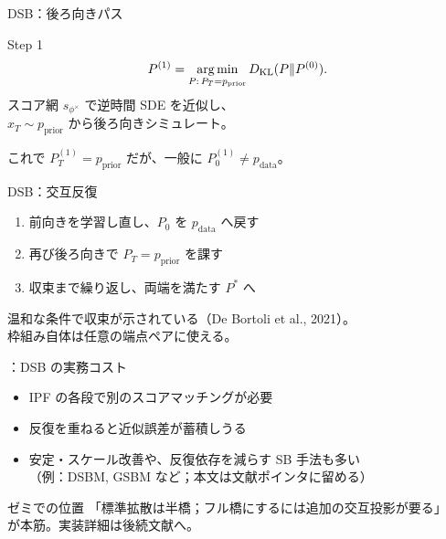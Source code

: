 \asmain
\begin{frame}{DSB：後ろ向きパス}
    \begin{block}{Step 1}
        \[
            P^{(1)}
            =
            \operatorname*{arg\,min}_{P:\,P_T=p_{\mathrm{prior}}}
            D_{\mathrm{KL}}(P\|P^{(0)}).
        \]
        スコア網 $s_{\phi^\times}$ で逆時間 SDE を近似し、\\
        $x_T\sim p_{\mathrm{prior}}$ から後ろ向きシミュレート。
    \end{block}
    これで $P_T^{(1)}=p_{\mathrm{prior}}$ だが、一般に $P_0^{(1)}\neq p_{\mathrm{data}}$。
\end{frame}
\asmain
\begin{frame}{DSB：交互反復}
    \begin{enumerate}
        \item 前向きを学習し直し、$P_0$ を $p_{\mathrm{data}}$ へ戻す
        \item 再び後ろ向きで $P_T=p_{\mathrm{prior}}$ を課す
        \item 収束まで繰り返し、両端を満たす $P^*$ へ
    \end{enumerate}
    温和な条件で収束が示されている（De Bortoli et al., 2021）。\\
    枠組み自体は任意の端点ペアに使える。
\end{frame}
\assuppl
\begin{frame}{\supplmark：DSB の実務コスト}
    \begin{itemize}
        \item IPF の各段で別のスコアマッチングが必要
        \item 反復を重ねると近似誤差が蓄積しうる
        \item 安定・スケール改善や、反復依存を減らす SB 手法も多い\\
        （例：DSBM, GSBM など；本文は文献ポインタに留める）
    \end{itemize}
    \begin{exampleblock}{ゼミでの位置}
        「標準拡散は半橋；フル橋にするには追加の交互投影が要る」\\
        が本筋。実装詳細は後続文献へ。
    \end{exampleblock}
\end{frame}
